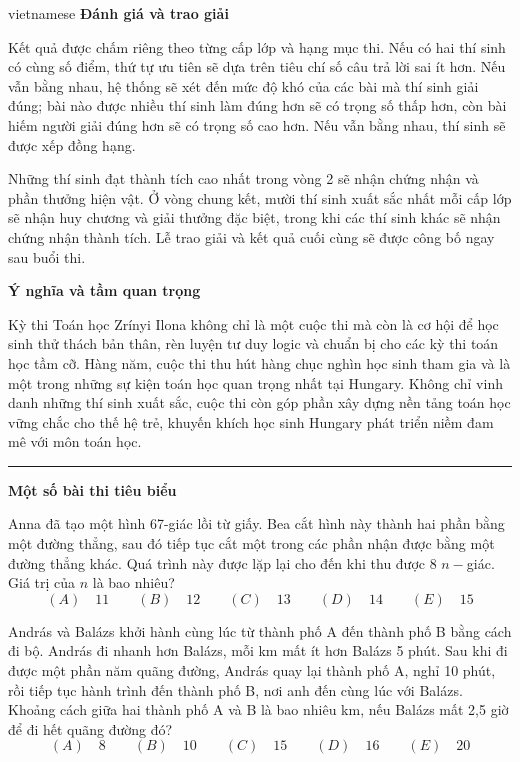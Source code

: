 \documentclass{article}
\begin{document}
\begin{otherlanguage*}{vietnamese}
\textbf{Đánh giá và trao giải}

Kết quả được chấm riêng theo từng cấp lớp và hạng mục thi. Nếu có hai thí sinh có cùng số điểm, thứ tự ưu tiên sẽ dựa trên tiêu chí số câu trả lời sai ít hơn.
Nếu vẫn bằng nhau, hệ thống sẽ xét đến mức độ khó của các bài mà thí sinh giải đúng; bài nào được nhiều thí sinh làm đúng hơn sẽ có trọng số thấp hơn,
còn bài hiếm người giải đúng hơn sẽ có trọng số cao hơn. Nếu vẫn bằng nhau, thí sinh sẽ được xếp đồng hạng.

Những thí sinh đạt thành tích cao nhất trong vòng 2 sẽ nhận chứng nhận và phần thưởng hiện vật.
Ở vòng chung kết, mười thí sinh xuất sắc nhất mỗi cấp lớp sẽ nhận huy chương và giải thưởng đặc biệt, trong khi các thí sinh khác sẽ nhận chứng nhận thành tích.
Lễ trao giải và kết quả cuối cùng sẽ được công bố ngay sau buổi thi.

\textbf{Ý nghĩa và tầm quan trọng}

Kỳ thi Toán học Zrínyi Ilona không chỉ là một cuộc thi mà còn là cơ hội để học sinh thử thách bản thân,
rèn luyện tư duy logic và chuẩn bị cho các kỳ thi toán học tầm cỡ.
Hàng năm, cuộc thi thu hút hàng chục nghìn học sinh tham gia và là một trong những sự kiện toán học quan trọng nhất tại Hungary.
Không chỉ vinh danh những thí sinh xuất sắc, cuộc thi còn góp phần xây dựng nền tảng toán học vững chắc cho thế hệ trẻ,
khuyến khích học sinh Hungary phát triển niềm đam mê với môn toán học.

\bigbreak

\noindent\rule{16.5cm}{0.4pt}

\textbf{Một số bài thi tiêu biểu}

\bigbreak

\begin{problem*}
    Anna đã tạo một hình 67-giác lồi từ giấy. Bea cắt hình này thành hai phần bằng một đường thẳng, sau đó tiếp tục cắt một trong các phần nhận được bằng một đường thẳng khác.
    Quá trình này được lặp lại cho đến khi thu được 8 $n-$giác. Giá trị của $n$ là bao nhiêu?
    \[
        (A) \quad 11 \qquad
        (B) \quad 12 \qquad
        (C) \quad 13 \qquad
        (D) \quad 14 \qquad
        (E) \quad 15
    \]
\end{problem*}

\begin{problem*}
    András và Balázs khởi hành cùng lúc từ thành phố A đến thành phố B bằng cách đi bộ. András đi nhanh hơn Balázs, mỗi km mất ít hơn Balázs 5 phút.
    Sau khi đi được một phần năm quãng đường, András quay lại thành phố A, nghỉ 10 phút, rồi tiếp tục hành trình đến thành phố B, nơi anh đến cùng lúc với Balázs.
    Khoảng cách giữa hai thành phố A và B là bao nhiêu km, nếu Balázs mất 2,5 giờ để đi hết quãng đường đó?
    \[
        (A) \quad 8 \qquad
        (B) \quad 10 \qquad
        (C) \quad 15 \qquad
        (D) \quad 16 \qquad
        (E) \quad 20
    \]
\end{problem*}


\end{otherlanguage*}
\end{document}
